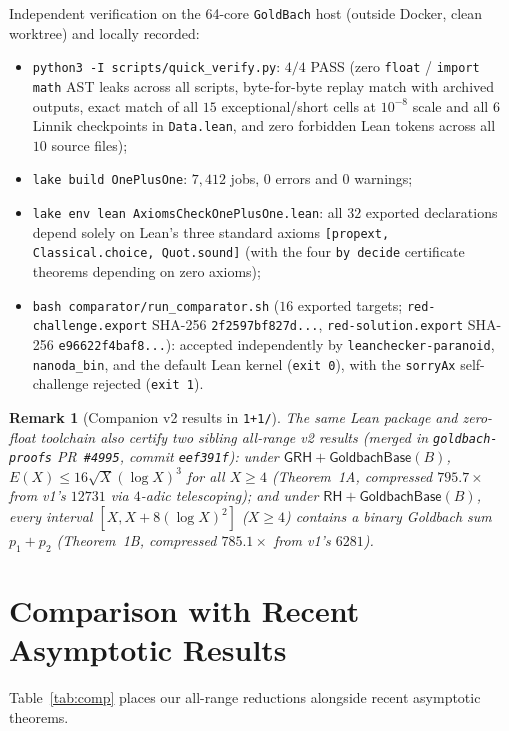 \documentclass[11pt,a4paper]{article}
\newtheorem{remark}[theorem]{Remark}
\newcommand{\GoldbachBase}{\mathsf{GoldbachBase}}
\newcommand{\GRH}{\mathsf{GRH}}
\begin{document}
Independent verification on the 64-core \texttt{GoldBach} host (outside Docker, clean worktree) and locally recorded:
\begin{itemize}[leftmargin=2em,itemsep=2pt]
  \item \texttt{python3 -I scripts/quick\_verify.py}: $4/4$ PASS (zero \texttt{float} / \texttt{import math} AST leaks across all scripts, byte-for-byte replay match with archived outputs, exact match of all $15$ exceptional/short cells at $10^{-8}$ scale and all $6$ Linnik checkpoints in \texttt{Data.lean}, and zero forbidden Lean tokens across all $10$ source files);
  \item \texttt{lake build OnePlusOne}: $7{,}412$ jobs, $0$ errors and $0$ warnings;
  \item \texttt{lake env lean AxiomsCheckOnePlusOne.lean}: all $32$ exported declarations depend solely on Lean's three standard axioms \texttt{[propext, Classical.choice, Quot.sound]} (with the four \texttt{by decide} certificate theorems depending on zero axioms);
  \item \texttt{bash comparator/run\_comparator.sh} ($16$ exported targets; \texttt{red-challenge.export} SHA-256 \texttt{2f2597bf827d...}, \texttt{red-solution.export} SHA-256 \texttt{e96622f4baf8...}): accepted independently by \texttt{leanchecker-paranoid}, \texttt{nanoda\_bin}, and the default Lean kernel (\texttt{exit 0}), with the \texttt{sorryAx} self-challenge rejected (\texttt{exit 1}).
\end{itemize}

\begin{remark}[Companion v2 results in \texttt{1+1/}]
The same Lean package and zero-float toolchain also certify two sibling all-range v2 results (merged in \texttt{goldbach-proofs} PR~\texttt{\#4995}, commit \texttt{eef391f}): under $\GRH + \GoldbachBase(B)$, $E(X) \le 16\sqrt{X}(\log X)^3$ for all $X \ge 4$ (Theorem~1A, compressed $795.7\times$ from v1's $12731$ via $4$-adic telescoping); and under $\mathsf{RH} + \GoldbachBase(B)$, every interval $[X, X + 8(\log X)^2]$ ($X \ge 4$) contains a binary Goldbach sum $p_1 + p_2$ (Theorem~1B, compressed $785.1\times$ from v1's $6281$).
\end{remark}

\section{Comparison with Recent Asymptotic Results}

Table~\ref{tab:comp} places our all-range reductions alongside recent asymptotic theorems.
\end{document}
